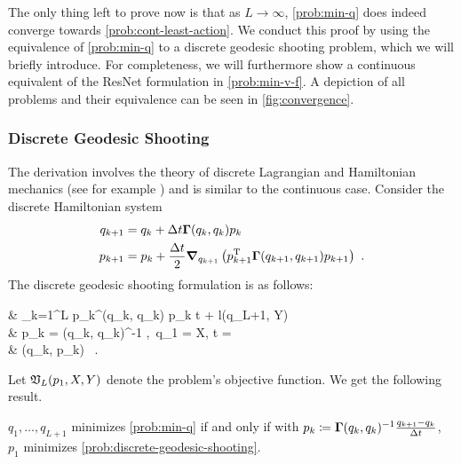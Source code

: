 
The only thing left to prove now is that as $L \rightarrow \infty$, \cref{prob:min-q} does indeed converge towards \cref{prob:cont-least-action}.
We conduct this proof by using the equivalence of \cref{prob:min-q} to a discrete geodesic shooting problem, which we will briefly introduce.
For completeness, we will furthermore show a continuous equivalent of the ResNet formulation in \cref{prob:min-v-f}.
A depiction of all problems and their equivalence can be seen in \cref{fig:convergence}.



\subsubsection{Discrete Geodesic Shooting}

The derivation involves the theory of discrete Lagrangian and Hamiltonian mechanics (see for example \cite{west04}) and is similar to the continuous case.
Consider the discrete Hamiltonian system
\begin{equation}
	\label{eq:discrete-hamiltonian-system}
	\begin{split}
		q_{k+1} &= q_k + \Delta t \mathbf{\Gamma}(q_k, q_k) p_k\\
		p_{k+1} &= p_k + \frac{\Delta t}{2} \grad_{q_{k+1}} \left(p_{k+1}^{\mathrm{T}} \mathbf{\Gamma}(q_{k+1}, q_{k+1}) p_{k+1}\right)\ .
	\end{split}
\end{equation}
The discrete geodesic shooting formulation is as follows:
\begin{problem}
	\label{prob:discrete-geodesic-shooting}
	\begin{cases}
		 &  \sum_{k=1}^L p_k^\T \bGamma(q_k, q_k) p_k \Delta t + l(q_{L+1}, Y)\\
		 & p_k = \bGamma(q_k, q_k)^{-1} ,\ q_1 = X, \Delta t =  \\
		& (q_k, p_k) \ .
	\end{cases}
\end{problem}
Let $\mathfrak{V}_L(p_1, X, Y)$ denote the problem's objective function.
We get the following result.
\begin{theorem}
	\label{theo:discrete-shooting-min-q-equivalence}
	$q_1, \dots, q_{L+1}$ minimizes \cref{prob:min-q} if and only if with $p_k \coloneqq \mathbf{\Gamma}(q_k, q_k)^{-1} \frac{q_{k+1} - q_k}{\Delta t}$, $p_1$ minimizes \cref{prob:discrete-geodesic-shooting}.
\end{theorem}

